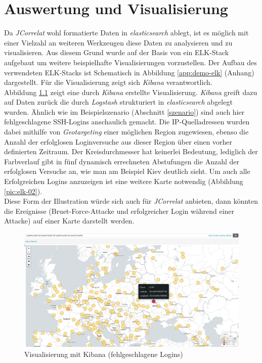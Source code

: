 \chapter{Auswertung und Visualisierung}\label{ausblick}
\thispagestyle{fancy}

Da \textit{JCorrelat} wohl formatierte Daten in \textit{elasticsearch} ablegt, ist es 
möglich mit einer Vielzahl an weiteren Werkzeugen diese Daten zu analysieren und zu 
visualisieren. Aus diesem Grund wurde auf der Basis von \cite{kleindienst} ein 
ELK-Stack aufgebaut um weitere beispielhafte Visualisierungen vorzustellen. Der 
Aufbau des verwendeten ELK-Stacks ist Schematisch in Abbildung \ref{app:demo-elk} (Anhang)
dargestellt. Für die Visualisierung zeigt sich \textit{Kibana} verantwortlich.\\
Abbildung \ref{pic:elk-01} zeigt eine durch \textit{Kibana} erstellte Visualisierung. 
\textit{Kibana} greift dazu auf Daten zurück die durch \textit{Logstash} strukturiert in 
\textit{elasticsearch} abgelegt wurden.
Ähnlich wie im Beispielszenario (Abschnitt \ref{szenario}) sind auch hier fehlgeschlagene 
SSH-Logins anschaulich gemacht. Die IP-Quelladressen wurden dabei mithilfe von 
\textit{Geotargeting} einer möglichen Region zugewiesen, ebenso die Anzahl der 
erfolglosen Loginversuche aus dieser Region über einen vorher definierten Zeitraum. Der 
Kreisdurchmesser hat keinerlei Bedeutung, lediglich der Farbverlauf gibt in fünf 
dynamisch errechneten Abstufungen die Anzahl der erfolglosen Versuche an, wie man am 
Beispiel Kiev deutlich sieht. Um auch alle Erfolgreichen Logins anzuzeigen ist eine 
weitere Karte notwendig (Abbildung \ref{pic:elk-02}).\\
Diese Form der Illustration würde sich auch für \textit{JCorrelat} anbieten, dann 
könnten die Ereignisse (Bruet-Force-Attacke und erfolgreicher Login während einer Attacke)
auf einer Karte darstellt werden.

\begin{figure}[htbp]
    \caption{Visualisierung mit Kibana (fehlgeschlagene Logins)}
    \label{pic:elk-01}\vspace{0.2cm}
    \centering
    \includegraphics[scale=0.28]{img/elk-01}  
\end{figure}


